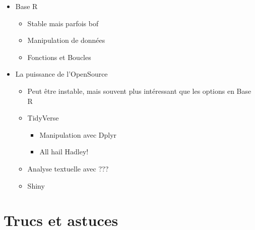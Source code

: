 \documentclass[
  letterpaper,
  DIV=11,
  numbers=noendperiod]{scrreprt}
\providecommand{\tightlist}{%
  \setlength{\itemsep}{0pt}\setlength{\parskip}{0pt}}\usepackage{longtable,booktabs,array}
\begin{document}
\begin{itemize}
\tightlist
\item
  Base R

  \begin{itemize}
  \tightlist
  \item
    Stable mais parfois bof
  \item
    Manipulation de données
  \item
    Fonctions et Boucles
  \end{itemize}
\item
  La puissance de l'OpenSource

  \begin{itemize}
  \tightlist
  \item
    Peut être instable, mais souvent plus intéressant que les options en
    Base R
  \item
    TidyVerse

    \begin{itemize}
    \tightlist
    \item
      Manipulation avec Dplyr
    \item
      All hail Hadley!
    \end{itemize}
  \item
    Analyse textuelle avec ???
  \item
    Shiny
  \end{itemize}
\end{itemize}

\hypertarget{trucs-et-astuces}{%
\section{Trucs et astuces}\label{trucs-et-astuces}}
\end{document}
